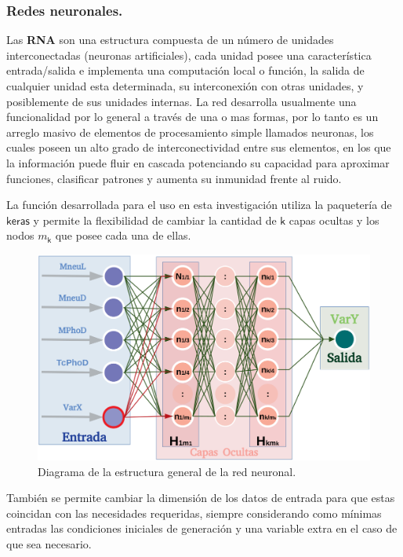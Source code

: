 \subsubsection{Redes neuronales.}
Las \textbf{RNA} son una estructura compuesta de un número de unidades interconectadas (neuronas artificiales), cada unidad posee una característica entrada/salida e implementa una computación local o función, la salida de cualquier unidad esta determinada, su interconexión con otras unidades, y posiblemente de sus unidades internas. La red desarrolla usualmente una funcionalidad por lo general a través de una o mas formas, por lo tanto es un arreglo masivo de elementos de procesamiento simple llamados neuronas, los cuales poseen un alto grado de interconectividad entre sus elementos, en los que la información puede fluir en cascada potenciando su capacidad para aproximar funciones, clasificar patrones y aumenta su inmunidad frente al ruido. 

La función desarrollada para el uso en esta investigación utiliza la paquetería de $\textsf{keras}$ y permite la flexibilidad de cambiar la cantidad de $\textsf{k}$ capas ocultas y los nodos $m_\textsf{k}$ que posee cada una de ellas.



\begin{figure}[!ht]
\centering
\includegraphics[width=1\textwidth]{Simulacion/imagenes/neuronas.png}
\caption{Diagrama de la estructura general de la red neuronal.}
\label{neuronas}
\end{figure}

También se permite cambiar la dimensión de los datos de entrada para que estas coincidan con las necesidades requeridas, siempre considerando como mínimas entradas las condiciones iniciales de generación y una variable extra en el caso de que sea necesario.

